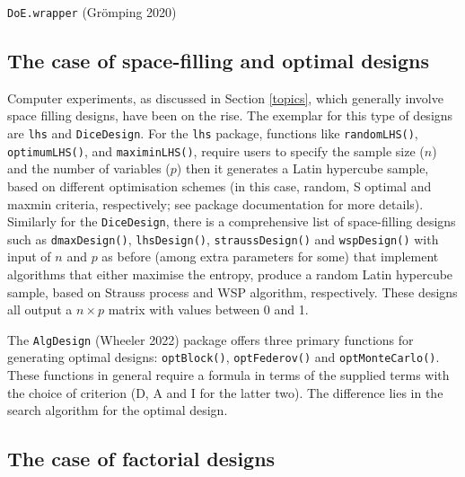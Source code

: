 \documentclass{article}
\begin{document}
\texttt{DoE.wrapper} (Grömping 2020)

\hypertarget{the-case-of-space-filling-and-optimal-designs}{%
\subsection{The case of space-filling and optimal
designs}\label{the-case-of-space-filling-and-optimal-designs}}

Computer experiments, as discussed in Section \ref{topics}, which
generally involve space filling designs, have been on the rise. The
exemplar for this type of designs are \texttt{lhs} and
\texttt{DiceDesign}. For the \texttt{lhs} package, functions like
\texttt{randomLHS()}, \texttt{optimumLHS()}, and \texttt{maximinLHS()},
require users to specify the sample size (\(n\)) and the number of
variables (\(p\)) then it generates a Latin hypercube sample, based on
different optimisation schemes (in this case, random, S optimal and
maxmin criteria, respectively; see package documentation for more
details). Similarly for the \texttt{DiceDesign}, there is a
comprehensive list of space-filling designs such as
\texttt{dmaxDesign()}, \texttt{lhsDesign()}, \texttt{straussDesign()}
and \texttt{wspDesign()} with input of \(n\) and \(p\) as before (among
extra parameters for some) that implement algorithms that either
maximise the entropy, produce a random Latin hypercube sample, based on
Strauss process and WSP algorithm, respectively. These designs all
output a \(n \times p\) matrix with values between 0 and 1.

The \texttt{AlgDesign} (Wheeler 2022) package offers three primary
functions for generating optimal designs: \texttt{optBlock()},
\texttt{optFederov()} and \texttt{optMonteCarlo()}. These functions in
general require a formula in terms of the supplied terms with the choice
of criterion (D, A and I for the latter two). The difference lies in the
search algorithm for the optimal design.

\hypertarget{the-case-of-factorial-designs}{%
\subsection{The case of factorial
designs}\label{the-case-of-factorial-designs}}
\end{document}
